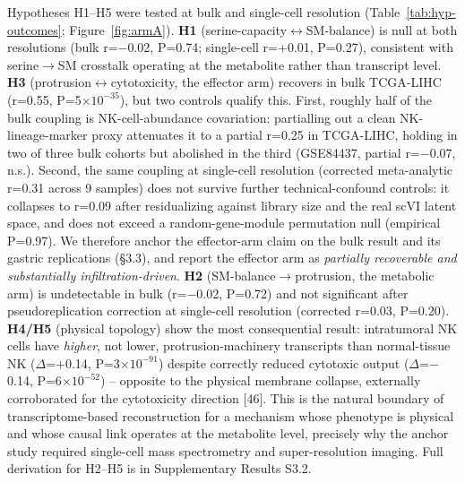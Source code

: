 \documentclass[modern,large,numbered,nocrop]{oup-authoring-template}
\begin{document}
Hypotheses H1--H5 were tested at bulk and single-cell resolution (Table~\ref{tab:hyp-outcomes}; Figure~\ref{fig:armA}). \textbf{H1} (serine-capacity$\leftrightarrow$SM-balance) is null at both resolutions (bulk r=$-$0.02, P=0.74; single-cell r=+0.01, P=0.27), consistent with serine$\to$SM crosstalk operating at the metabolite rather than transcript level. \textbf{H3} (protrusion$\leftrightarrow$cytotoxicity, the effector arm) recovers in bulk TCGA-LIHC (r=0.55, P=5$\times$$10^{-35}$), but two controls qualify this. First, roughly half of the bulk coupling is NK-cell-abundance covariation: partialling out a clean NK-lineage-marker proxy attenuates it to a partial r=0.25 in TCGA-LIHC, holding in two of three bulk cohorts but abolished in the third (GSE84437, partial r=$-$0.07, n.s.). Second, the same coupling at single-cell resolution (corrected meta-analytic r=0.31 across 9 samples) does not survive further technical-confound controls: it collapses to r=0.09 after residualizing against library size and the real scVI latent space, and does not exceed a random-gene-module permutation null (empirical P=0.97). We therefore anchor the effector-arm claim on the bulk result and its gastric replications (\S{}3.3), and report the effector arm as \textit{partially recoverable and substantially infiltration-driven}. \textbf{H2} (SM-balance$\to$protrusion, the metabolic arm) is undetectable in bulk (r=$-$0.02, P=0.72) and not significant after pseudoreplication correction at single-cell resolution (corrected r=0.03, P=0.20). \textbf{H4/H5} (physical topology) show the most consequential result: intratumoral NK cells have \textit{higher}, not lower, protrusion-machinery transcripts than normal-tissue NK ($\Delta$=+0.14, P=3$\times$$10^{-91}$) despite correctly reduced cytotoxic output ($\Delta$=$-$0.14, P=6$\times$$10^{-52}$) -- opposite to the physical membrane collapse, externally corroborated for the cytotoxicity direction [46]. This is the natural boundary of transcriptome-based reconstruction for a mechanism whose phenotype is physical and whose causal link operates at the metabolite level, precisely why the anchor study required single-cell mass spectrometry and super-resolution imaging. Full derivation for H2--H5 is in Supplementary Results S3.2.
\end{document}
